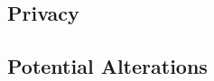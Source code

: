 \documentclass[12pt]{report}
\begin{document}


\subsection{Privacy} %


\subsection{Potential Alterations}  %

\end{document}
